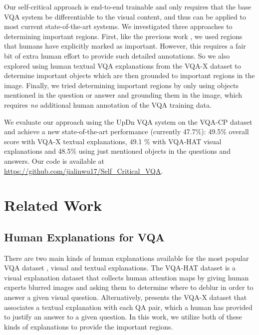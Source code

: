 \documentclass{article}
\begin{document}
Our self-critical approach is end-to-end trainable and only requires that the base VQA system be differentiable to the visual content, and thus can be applied to most current state-of-the-art systems. We investigated three approaches to determining important regions. First,
like the previous work \cite{trott2017interpretable,zhang2019interpretable,selvaraju2019taking,qiao2018exploring}, we used regions that humans have explicitly marked as important. However, this requires a fair bit of extra human effort to provide such detailed annotations.
So we also explored using human textual VQA explanations from the  VQA-X \cite{park2018multimodal} dataset to determine important objects which are then grounded to important regions in the image. Finally, we tried determining important regions by only using objects mentioned in the question or answer and grounding them in the image, which requires {\it no} additional human annotation of the VQA training data.

We evaluate our approach using the UpDn VQA system \cite{anderson2017bottom} on the VQA-CP dataset \cite{vqa-cp} and achieve a new state-of-the-art performance (currently 47.7\%):  49.5\% overall score with VQA-X \cite{park2018multimodal} textual explanations, 49.1 \% with VQA-HAT \cite{das2017human} visual explanations and 48.5\% using just mentioned objects in the questions and answers.  Our code is available at \url{https://github.com/jialinwu17/Self_Critical_VQA}.

\section{Related Work}
\subsection{Human Explanations for VQA}
There are two main kinds of human explanations available for the most popular VQA dataset \cite{antol2015vqa},  visual and textual explanations. The VQA-HAT dataset \cite{das2017human} is a visual explanation dataset that collects human attention maps by giving human experts blurred images and asking them to determine where to deblur in order to answer a given visual question. Alternatively, \cite{park2018multimodal} presents the VQA-X dataset that associates a textual explanation with each QA pair, which a human has provided to justify an answer to a given question. In this work, we utilize both of these kinds of explanations to provide the important regions. 
\end{document}
